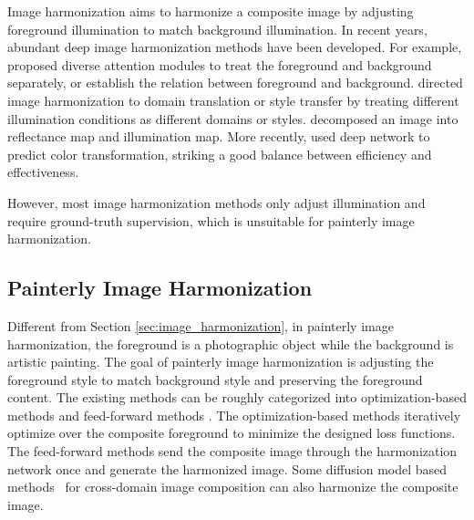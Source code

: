 \documentclass[letterpaper]{article} %
\begin{document}
Image harmonization aims to harmonize a composite image by adjusting foreground illumination to match background illumination.
In recent years, abundant deep image harmonization methods \cite{tsai2017deep,Jiang_2021_ICCV,xing2022composite,peng2022frih,zhu2022image,valanarasu2022interactive,LEMaRT} have been developed. For example, \cite{xiaodong2019improving,Hao2020bmcv,sofiiuk2021foreground} proposed diverse attention modules to treat the foreground and background separately, or establish the relation between foreground and background. \cite{cong2020dovenet,cong2021bargainnet,ling2021region,hang2022scs} directed image harmonization to domain translation or style transfer by treating different illumination conditions as different domains or styles.  \cite{guo2021image,guo2021intrinsic,guo2022transformer}  decomposed an image into reflectance map and illumination map.  More recently, \cite{cong2022high,ke2022harmonizer,liang2021spatial,xue2022dccf,PCTNet,WangCVPR2023} used deep network to predict color transformation, striking a good balance between efficiency and effectiveness.

However, most image harmonization methods only adjust illumination and require ground-truth supervision, which is unsuitable for painterly image harmonization.

\subsection{Painterly Image Harmonization}

Different from Section \ref{sec:image_harmonization}, in painterly image harmonization, the foreground is a photographic object while the background is artistic painting. The goal of painterly image harmonization is adjusting the foreground style to match background style and preserving the foreground content. The existing methods \cite{luan2018deep,zhang2020deep,peng2019element} can be roughly categorized into optimization-based methods \cite{luan2018deep,zhang2020deep} and feed-forward methods \cite{peng2019element}.  The optimization-based methods \cite{luan2018deep,zhang2020deep} iteratively optimize over the composite foreground to minimize the designed loss functions. The feed-forward methods \cite{peng2019element,yan2022style,cao2022painterly} send the composite image through the harmonization network once and generate the harmonized image. %
Some diffusion model based methods~\cite{sdedit,cdc} for cross-domain image composition can also harmonize the composite image.
\end{document}
